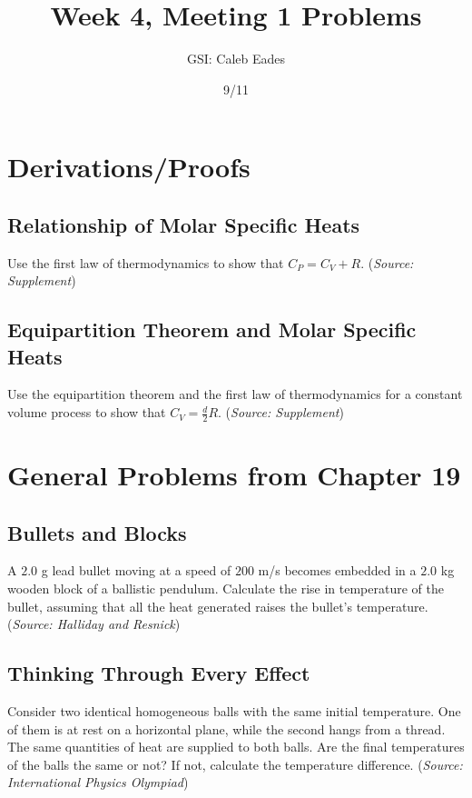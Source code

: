 \documentclass{article}
\begin{document}
	
\title{Week 4, Meeting 1 Problems}
\author{GSI: Caleb Eades}
\date{9/11}
\maketitle

\section{Derivations/Proofs}

\subsection{Relationship of Molar Specific Heats}

Use the first law of thermodynamics to show that $C_P = C_V + R$. (\textit{Source: Supplement})

\subsection{Equipartition Theorem and Molar Specific Heats}

Use the equipartition theorem and the first law of thermodynamics for a constant volume process to show that $C_V = \frac{d}{2}R$. (\textit{Source: Supplement})

\newpage

\section{General Problems from Chapter 19}

\subsection{Bullets and Blocks}

A $2.0$ g lead bullet moving at a speed of $200$ m/s becomes embedded in a $2.0$ kg wooden block of a ballistic pendulum. Calculate the rise in temperature of the bullet, assuming that all the heat generated raises the bullet's temperature. (\textit{Source: Halliday and Resnick})

\subsection{Thinking Through Every Effect}

Consider two identical homogeneous balls with the same initial temperature. One of them is at rest on a horizontal plane, while the second hangs from a thread. The same quantities of heat are supplied to both balls. Are the final temperatures of the balls the same or not? If not, calculate the temperature difference. (\textit{Source: International Physics Olympiad})
\end{document}
